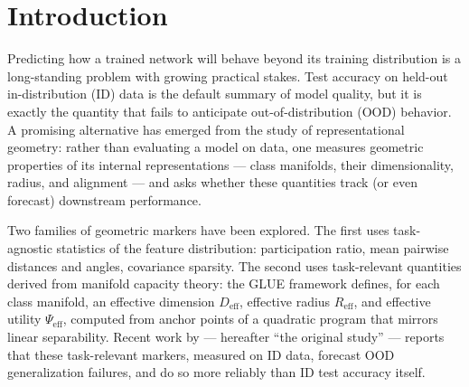 \documentclass[10pt]{article} %
\begin{document}
\begin{abstract}
structural corruptions (fog, brightness, contrast), ID accuracy is restored as the strongest predictor ($\rho_{\text{resid}} = +0.82$ to $+0.97$, ranked 1st of 12 markers); under noise and compression corruptions it weakens ($\rho_{\text{resid}} = -0.11$ to $+0.19$, ranked 2nd--7th), and no single candidate marker dominates it there. A single aggregate statement about corruption robustness averages over two opposite regimes. A third, independent observation explains why the baseline behaves this way. On our 48 self-trained models, \emph{task-agnostic} geometric markers and ID accuracy are \textbf{nearly uncorrelated with each other} ($-0.17$ to $-0.04$) while the markers correlate at $+0.90$ to $+0.95$ with OOD accuracy and ID accuracy does not ($-0.05$). The two candidate signals measure different things --- how well the network fits the training distribution versus how its learned representation is organised --- and on class-level shifts only the second is informative. We conclude that the predictive value of representational-geometry markers is conditional on both the task-relevance of the marker and the type of distribution shift, and that claims that geometric markers ``replace'' ID accuracy must state these qualifications explicitly. We release the control protocol as a reusable diagnostic and validate it on independently trained model families across two class-level shifts, where the baseline's sign instability replicates.
\end{abstract}

\section{Introduction}
\label{sec:intro}

Predicting how a trained network will behave beyond its training distribution is a long-standing problem with growing practical stakes. Test accuracy on held-out in-distribution (ID) data is the default summary of model quality, but it is exactly the quantity that fails to anticipate out-of-distribution (OOD) behavior. A promising alternative has emerged from the study of representational geometry: rather than evaluating a model on data, one measures geometric properties of its internal representations --- class manifolds, their dimensionality, radius, and alignment --- and asks whether these quantities track (or even forecast) downstream performance.

Two families of geometric markers have been explored. The first uses task-agnostic statistics of the feature distribution: participation ratio, mean pairwise distances and angles, covariance sparsity. The second uses task-relevant quantities derived from manifold capacity theory: the GLUE framework \citep{chou2025feature} defines, for each class manifold, an effective dimension $D_{\mathrm{eff}}$, effective radius $R_{\mathrm{eff}}$, and effective utility $\Psi_{\mathrm{eff}}$, computed from anchor points of a quadratic program that mirrors linear separability. Recent work by \citet{chou2026diagnosing} --- hereafter ``the original study'' --- reports that these task-relevant markers, measured on ID data, forecast OOD generalization failures, and do so more reliably than ID test accuracy itself.
\end{document}
